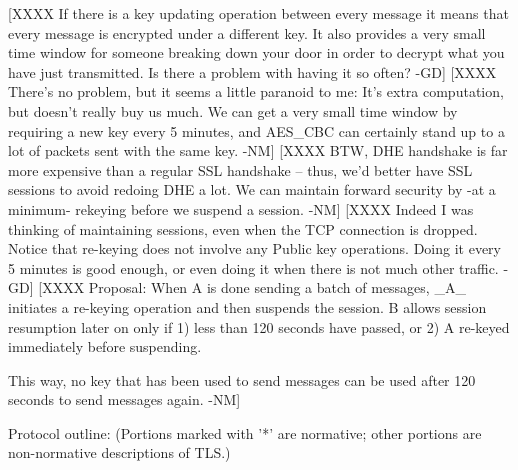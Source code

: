 [XXXX If there is a key updating operation between every message it means
that every message is encrypted under a different key. It also
provides a very small time window for someone breaking down your door
in order to decrypt what you have just transmitted. Is there a problem
with having it so often? -GD]
[XXXX There's no problem, but it seems a little paranoid to me: It's
extra computation, but doesn't really buy us much.  We can get a very
small time window by requiring a new key every 5 minutes, and AES_CBC
can certainly stand up to a lot of packets sent with the same
key. -NM]
[XXXX BTW, DHE handshake is far more expensive than a regular SSL
handshake -- thus, we'd better have SSL sessions to avoid redoing DHE
a lot.  We can maintain forward security by -at a minimum- rekeying
before we suspend a session. -NM]
[XXXX Indeed I was thinking of maintaining sessions, even when the TCP
connection is dropped. Notice that re-keying does not involve any
Public key operations. Doing it every 5 minutes is good enough, or
even doing it when there is not much other traffic. -GD]
[XXXX
 Proposal: When A is done sending a batch of messages, _A_ initiates a
   re-keying operation and then suspends the session.  B allows
   session resumption later on only if 1) less than 120 seconds have
   passed, or 2) A re-keyed immediately before suspending.

   This way, no key that has been used to send messages can be used
   after 120 seconds to send messages again. -NM]

Protocol outline: (Portions marked with '*' are normative; other
portions are non-normative descriptions of TLS.)

